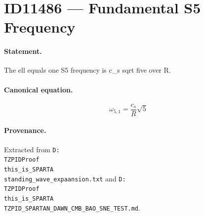 \section*{ID11486 --- Fundamental S5 Frequency}

\paragraph{Statement.}
The ell equals one S5 frequency is c_s sqrt five over R.

\paragraph{Canonical equation.}
\[
\omega_{5,1}=\frac{c_s}{R}\sqrt5
\]

\paragraph{Provenance.}
Extracted from \texttt{D:\\TZPIDProof\\this\_is\_SPARTA\\standing\_wave\_expaansion.txt} and \texttt{D:\\TZPIDProof\\this\_is\_SPARTA\\TZPID\_SPARTAN\_DAWN\_CMB\_BAO\_SNE\_TEST.md}.
